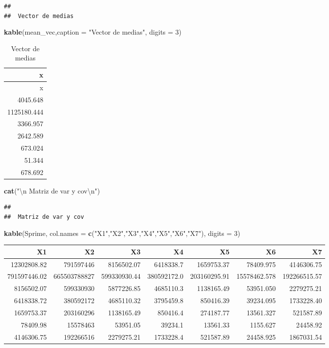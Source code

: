 \documentclass[]{article}
\newenvironment{Shaded}{\begin{snugshade}}{\end{snugshade}}
\newcommand{\CharTok}[1]{\textcolor[rgb]{0.31,0.60,0.02}{#1}}
\newcommand{\DataTypeTok}[1]{\textcolor[rgb]{0.13,0.29,0.53}{#1}}
\newcommand{\DecValTok}[1]{\textcolor[rgb]{0.00,0.00,0.81}{#1}}
\newcommand{\KeywordTok}[1]{\textcolor[rgb]{0.13,0.29,0.53}{\textbf{#1}}}
\newcommand{\NormalTok}[1]{#1}
\newcommand{\StringTok}[1]{\textcolor[rgb]{0.31,0.60,0.02}{#1}}
\begin{document}
\begin{verbatim}
## 
##  Vector de medias
\end{verbatim}

\begin{Shaded}
\begin{Highlighting}[]
\KeywordTok{kable}\NormalTok{(mean_vec,}\DataTypeTok{caption =} \StringTok{"Vector de medias"}\NormalTok{, }\DataTypeTok{digits =} \DecValTok{3}\NormalTok{)}
\end{Highlighting}
\end{Shaded}

\begin{longtable}[]{@{}r@{}}
\caption{Vector de medias}\tabularnewline
\toprule
x\tabularnewline
\midrule
\endfirsthead
\toprule
x\tabularnewline
\midrule
\endhead
4045.648\tabularnewline
1125180.444\tabularnewline
3366.957\tabularnewline
2642.589\tabularnewline
673.024\tabularnewline
51.344\tabularnewline
678.692\tabularnewline
\bottomrule
\end{longtable}

\begin{Shaded}
\begin{Highlighting}[]
\KeywordTok{cat}\NormalTok{(}\StringTok{"}\CharTok{\textbackslash{}n}\StringTok{ Matriz de var y cov}\CharTok{\textbackslash{}n}\StringTok{"}\NormalTok{)}
\end{Highlighting}
\end{Shaded}

\begin{verbatim}
## 
##  Matriz de var y cov
\end{verbatim}

\begin{Shaded}
\begin{Highlighting}[]
\KeywordTok{kable}\NormalTok{(Sprime, }\DataTypeTok{col.names =} \KeywordTok{c}\NormalTok{(}\StringTok{"X1"}\NormalTok{,}\StringTok{"X2"}\NormalTok{,}\StringTok{"X3"}\NormalTok{,}\StringTok{"X4"}\NormalTok{,}\StringTok{"X5"}\NormalTok{,}\StringTok{"X6"}\NormalTok{,}\StringTok{"X7"}\NormalTok{), }\DataTypeTok{digits =} \DecValTok{3}\NormalTok{)}
\end{Highlighting}
\end{Shaded}

\begin{longtable}[]{@{}rrrrrrr@{}}
\toprule
X1 & X2 & X3 & X4 & X5 & X6 & X7\tabularnewline
\midrule
\endhead
12302808.82 & 791597446 & 8156502.07 & 6418338.7 & 1659753.37 &
78409.975 & 4146306.75\tabularnewline
791597446.02 & 665503788827 & 599330930.44 & 380592172.0 & 203160295.91
& 15578462.578 & 192266515.57\tabularnewline
8156502.07 & 599330930 & 5877226.85 & 4685110.3 & 1138165.49 & 53951.050
& 2279275.21\tabularnewline
6418338.72 & 380592172 & 4685110.32 & 3795459.8 & 850416.39 & 39234.095
& 1733228.40\tabularnewline
1659753.37 & 203160296 & 1138165.49 & 850416.4 & 274187.77 & 13561.327 &
521587.89\tabularnewline
78409.98 & 15578463 & 53951.05 & 39234.1 & 13561.33 & 1155.627 &
24458.92\tabularnewline
4146306.75 & 192266516 & 2279275.21 & 1733228.4 & 521587.89 & 24458.925
& 1867031.54\tabularnewline
\bottomrule
\end{longtable}
\end{document}
